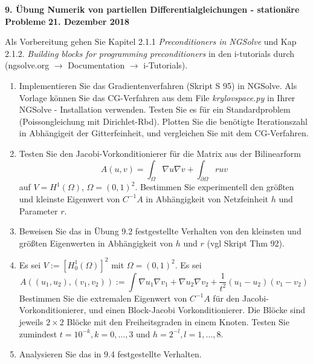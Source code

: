 \documentclass[11pt,a4paper]{report}
\begin{document}
\begin{center}
\textbf{9. \"Ubung Numerik von partiellen Differentialgleichungen - station\"are Probleme} \newline 
\textbf{21. Dezember 2018}
\end{center}

Als Vorbereitung gehen Sie Kapitel 2.1.1 {\em Preconditioners in NGSolve} und Kap
2.1.2. {\em Building blocks for programming preconditioners} in den
i-tutorials durch (ngsolve.org $\rightarrow$ Documentation $\rightarrow$ i-Tutorials).

\begin{enumerate}

\item Implementieren Sie das Gradientenverfahren (Skript S 95) in
  NGSolve. Als Vorlage k\"onnen Sie das CG-Verfahren  aus dem File 
  {\em krylovspace.py} in Ihrer NGSolve - Installation verwenden. 
Testen Sie es f\"ur ein Standardproblem (Poissongleichung mit
Dirichlet-Rbd). Plotten Sie die ben\"otigte Iterationszahl in Abh\"angigeit der
Gitterfeinheit, und vergleichen Sie mit dem CG-Verfahren.

\item Testen Sie den Jacobi-Vorkonditionierer f\"ur die Matrix aus der
  Bilinearform
  $$
  A(u,v) = \int_\Omega \nabla u \nabla v + \int_{\partial \Omega} r u
  v 
  $$
 auf $V = H^1(\Omega)$, $\Omega = (0,1)^2$.
Bestimmen Sie experimentell den gr\"o\ss{}ten und kleinste Eigenwert
von $C^{-1}A$ in Abh\"angigkeit von Netzfeinheit $h$ und Parameter
$r$.

\item Beweisen Sie das in \"Ubung 9.2 festgestellte Verhalten von den
  kleinsten und gr\"o\ss{}ten Eigenwerten in Abh\"angigkeit von $h$
  und $r$ (vgl Skript Thm 92).

\item Es sei $V := [H_0^1(\Omega)]^2$ mit $\Omega = (0,1)^2$. Es sei
  $$
  A( (u_1,u_2), (v_1, v_2) ) := \int \nabla u_1 \nabla v_1 + \nabla
  u_2 \nabla v_2  + \frac{1}{t^2} (u_1 - u_2) (v_1 - v_2) 
  $$
Bestimmen Sie die extremalen Eigenwert von $C^{-1} A$
f\"ur den Jacobi-Vorkonditionierer, und einen Block-Jacobi
Vorkonditionierer. Die Bl\"ocke sind jeweils $2\times2$ Bl\"ocke mit
den Freiheitsgraden in einem Knoten. Testen Sie zumindest $t =
10^{-k}, k = 0, \ldots, 3$ und $h = 2^{-l}, l = 1, \ldots, 8$.

\item Analysieren Sie das in 9.4 festgestellte Verhalten.
\end{enumerate}
\end{document}
